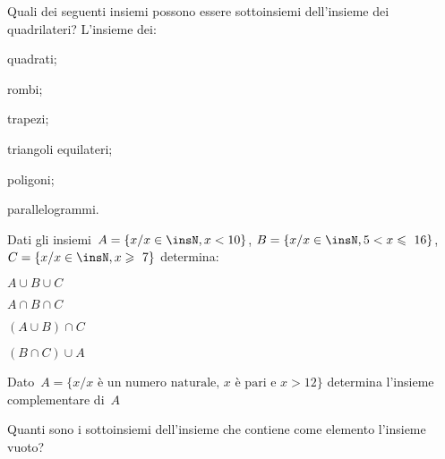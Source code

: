 \begin{esercizio}
\label{ese:7.84}
Quali dei seguenti insiemi possono essere sottoinsiemi dell'insieme dei 
quadrilateri?
L'insieme dei:
\vspace*{-12pt}
\begin{multicols}{3}
\begin{enumeratea}
 \item quadrati;
 \item rombi;
 \item trapezi;
 \item triangoli equilateri;
 \item poligoni;
 \item parallelogrammi.
\end{enumeratea}
\end{multicols}
\vspace{-12pt}
\end{esercizio}

\begin{esercizio}
\label{ese:7.85}
Dati gli insiemi~\(A=\{x/x\in\insN,x<10\}\), \(B=\{x/x\in\insN,5<x\leqslant~16\}\),
\(C=\{x/x\in \insN,x\geqslant~7\}\) determina:
\begin{multicols}{4}
\begin{enumeratea}
\item \(A\cup B\cup C\)
\item \(A\cap B\cap C\)
\item \((A\cup B)\cap C\)
\item \((B\cap C)\cup A\)
\end{enumeratea}
\end{multicols}
\end{esercizio}


\begin{esercizio}
\label{ese:7.86}
Dato~\(A = \{x/x\text{ è un numero naturale, } x \text{ è pari e }x>12\}\) 
determina l'insieme complementare di~\(A\)
\end{esercizio}

\begin{esercizio}
\label{ese:7.87}
Quanti sono i sottoinsiemi dell'insieme che contiene come elemento
l'insieme vuoto?
\end{esercizio}


